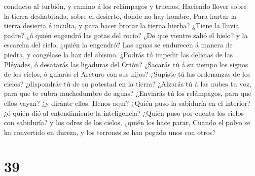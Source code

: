 conducto al turbión, y camino á los relámpagos y truenos, 
Haciendo llover sobre la tierra deshabitada, sobre el desierto, donde no
hay hombre,  Para hartar la tierra desierta é inculta, y
para hacer brotar la tierna hierba?  ¿Tiene la lluvia
padre? ¿ó quién engendró las gotas del rocío?  ¿De qué
vientre salió el hielo? y la escarcha del cielo, ¿quién la engendró?
 Las aguas se endurecen á manera de piedra, y congélase la
haz del abismo.  ¿Podrás tú impedir las delicias de las
Pléyades, ó desatarás las ligaduras del Orión?  ¿Sacarás tú
á su tiempo los signos de los cielos, ó guiarás el Arcturo con sus
hijos?  ¿Supiste tú las ordenanzas de los cielos?
¿dispondrás tú de su potestad en la tierra?  ¿Alzarás tú á
las nubes tu voz, para que te cubra muchedumbre de aguas? 
¿Enviarás tú los relámpagos, para que ellos vayan? ¿y diránte ellos:
Henos aquí?  ¿Quién puso la sabiduría en el interior? ¿ó
quién dió al entendimiento la inteligencia?  ¿Quién puso
por cuenta los cielos con sabiduría? y los odres de los cielos, ¿quién
los hace parar,  Cuando el polvo se ha convertido en
dureza, y los terrones se han pegado unos con otros? 
 

\hypertarget{section-38}{%
\section{39}\label{section-38}}

